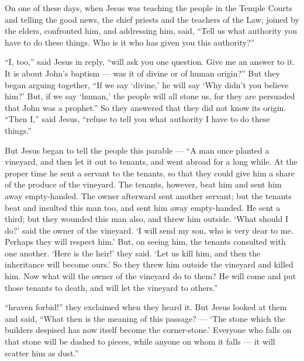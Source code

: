  On one of these days, when Jesus was teaching the people in
the Temple Courts and telling the good news, the chief priests and the
teachers of the Law, joined by the elders, confronted him, 
and addressing him, said, ``Tell us what authority you have to do these
things. Who is it who has given you this authority?''

 ``I, too,'' said Jesus in reply, ``will ask you one
question. Give me an answer to it.  It is about John's
baptism --- was it of divine or of human origin?''  But they
began arguing together, ``If we say `divine,' he will say `Why didn't
you believe him?'  But, if we say `human,' the people will
all stone us, for they are persuaded that John was a prophet.''
 So they answered that they did not know its origin.
 ``Then I,'' said Jesus, ``refuse to tell you what authority
I have to do these things.''

 But Jesus began to tell the people this parable --- ``A man
once planted a vineyard, and then let it out to tenants, and went abroad
for a long while.  At the proper time he sent a servant to
the tenants, so that they could give him a share of the produce of the
vineyard. The tenants, however, beat him and sent him away empty-handed.
 The owner afterward sent another servant; but the tenants
beat and insulted this man too, and sent him away empty-handed.
 He sent a third; but they wounded this man also, and threw
him outside.  `What should I do?' said the owner of the
vineyard. `I will send my son, who is very dear to me. Perhaps they will
respect him.'  But, on seeing him, the tenants consulted
with one another. `Here is the heir!' they said. `Let us kill him, and
then the inheritance will become ours.'  So they threw him
outside the vineyard and killed him. Now what will the owner of the
vineyard do to them?  He will come and put those tenants to
death, and will let the vineyard to others.''

``heaven forbid!'' they exclaimed when they heard it.  But
Jesus looked at them and said, ``What then is the meaning of this
passage? --- `The stone which the builders despised has now itself
become the corner-stone.'  Everyone who falls on that stone
will be dashed to pieces, while anyone on whom it falls --- it will
scatter him as dust.''


